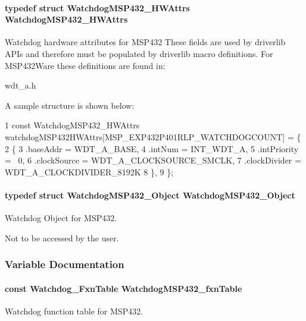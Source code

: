 \paragraph[{Watchdog\+M\+S\+P432\+\_\+\+H\+W\+Attrs}]{\setlength{\rightskip}{0pt plus 5cm}typedef struct {\bf Watchdog\+M\+S\+P432\+\_\+\+H\+W\+Attrs}  {\bf Watchdog\+M\+S\+P432\+\_\+\+H\+W\+Attrs}}\label{_watchdog_m_s_p432_8h_aa84a69b45dcb9d42a077d1bdfad211da}


Watchdog hardware attributes for M\+S\+P432 These fields are used by driverlib A\+P\+Is and therefore must be populated by driverlib macro definitions. For M\+S\+P432\+Ware these definitions are found in\+: 


\begin{DoxyItemize}
\item wdt\+\_\+a.\+h
\end{DoxyItemize}

A sample structure is shown below\+: 
\begin{DoxyCode}
1 const WatchdogMSP432\_HWAttrs watchdogMSP432HWAttrs[MSP\_EXP432P401RLP\_WATCHDOGCOUNT] = \{
2     \{
3         .baseAddr = WDT\_A\_BASE,
4         .intNum = INT\_WDT\_A,
5         .intPriority = ~0,
6         .clockSource = WDT\_A\_CLOCKSOURCE\_SMCLK,
7         .clockDivider = WDT\_A\_CLOCKDIVIDER\_8192K
8     \},
9 \};
\end{DoxyCode}
\paragraph[{Watchdog\+M\+S\+P432\+\_\+\+Object}]{\setlength{\rightskip}{0pt plus 5cm}typedef struct {\bf Watchdog\+M\+S\+P432\+\_\+\+Object}  {\bf Watchdog\+M\+S\+P432\+\_\+\+Object}}\label{_watchdog_m_s_p432_8h_adda7dce88065097cb75156432dbfbede}


Watchdog Object for M\+S\+P432. 

Not to be accessed by the user. 

\subsubsection{Variable Documentation}
\paragraph[{Watchdog\+M\+S\+P432\+\_\+fxn\+Table}]{\setlength{\rightskip}{0pt plus 5cm}const {\bf Watchdog\+\_\+\+Fxn\+Table} Watchdog\+M\+S\+P432\+\_\+fxn\+Table}\label{_watchdog_m_s_p432_8h_a7ccdf8f14ade7da8949b94ef66ec8a4f}


Watchdog function table for M\+S\+P432. 

